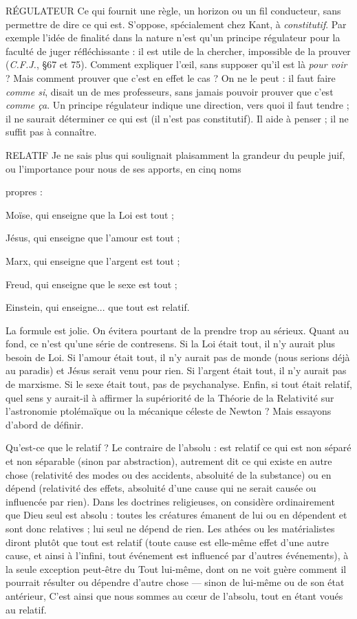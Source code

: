 RÉGULATEUR Ce qui fournit une règle, un horizon ou un fil conducteur,
sans permettre de dire ce qui est. S’oppose, spécialement
chez Kant, à {\it constitutif}. Par exemple l’idée de finalité dans la nature n’est qu’un
principe régulateur pour la faculté de juger réfléchissante : il est utile de la chercher,
impossible de la prouver ({\it C.F.J.}, \S 67 et 75). Comment expliquer l'œil,
sans supposer qu'il est là {\it pour voir} ? Mais comment prouver que c’est en effet
le cas ? On ne le peut : il faut faire {\it comme si}, disait un de mes professeurs, sans
jamais pouvoir prouver que c’est {\it comme ça}. Un principe régulateur indique une
direction, vers quoi il faut tendre ; il ne saurait déterminer ce qui est (il n’est
pas constitutif). Il aide à penser ; il ne suffit pas à connaître.

RELATIF Je ne sais plus qui soulignait plaisamment la grandeur du peuple
juif, ou l'importance pour nous de ses apports, en cinq noms

propres :

Moïse, qui enseigne que la Loi est tout ;

Jésus, qui enseigne que l’amour est tout ;

Marx, qui enseigne que l’argent est tout ;

Freud, qui enseigne que le sexe est tout ;

Einstein, qui enseigne... que tout est relatif.

La formule est jolie. On évitera pourtant de la prendre trop au sérieux.
Quant au fond, ce n’est qu’une série de contresens. Si la Loi était tout, il n’y
aurait plus besoin de Loi. Si l'amour était tout, il n’y aurait pas de monde (nous
serions déjà au paradis) et Jésus serait venu pour rien. Si l’argent était tout, il
n'y aurait pas de marxisme. Si le sexe était tout, pas de psychanalyse. Enfin, si
tout était relatif, quel sens y aurait-il à affirmer la supériorité de la Théorie de
la Relativité sur l’astronomie ptolémaïque ou la mécanique céleste de Newton ?
Mais essayons d’abord de définir.

Qu'est-ce que le relatif ? Le contraire de l'absolu : est relatif ce qui est non
séparé et non séparable (sinon par abstraction), autrement dit ce qui existe en
autre chose (relativité des modes ou des accidents, absoluité de la substance) ou
en dépend (relativité des effets, absoluité d’une cause qui ne serait causée ou
influencée par rien). Dans les doctrines religieuses, on considère ordinairement
que Dieu seul est absolu : toutes les créatures émanent de lui ou en dépendent
et sont donc relatives ; lui seul ne dépend de rien. Les athées ou les matérialistes
diront plutôt que tout est relatif (toute cause est elle-même effet d’une autre
cause, et ainsi à l'infini, tout événement est influencé par d’autres événements),
à la seule exception peut-être du Tout lui-même, dont on ne voit guère comment
il pourrait résulter ou dépendre d’autre chose — sinon de lui-même ou de
son état antérieur, C’est ainsi que nous sommes au cœur de l'absolu, tout en
étant voués au relatif.

